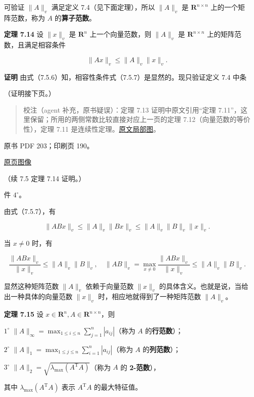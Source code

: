 \documentclass[
  10pt,
  fontset=fandol]{ctexart}
\begin{document}
可验证 \(\|A\|_v\) 满足定义 7.4（见下面定理），所以 \(\|A\|_v\) 是
\(\mathbf R^{n\times n}\) 上的一个矩阵范数，称为 \(A\)
的\textbf{算子范数}。

\textbf{定理 7.14} 设 \(\|x\|_v\) 是 \(\mathbf R^n\) 上一个向量范数，则
\(\|A\|_v\) 是 \(\mathbf R^{n\times n}\) 上的矩阵范数，且满足相容条件

\[
\|Ax\|_v\leqslant\|A\|_v\|x\|_v.
\tag{7.5.7}
\]

\textbf{证明}
由式（7.5.6）知，相容性条件式（7.5.7）是显然的。现只验证定义 7.4 中条

（证明接下页。）

\begin{quote}
校注（agent 补充，原书疑误）：定理 7.13 证明中原文引用``定理
7.11''，这里保留；所用的两侧常数比较直接对应上一页的定理
7.12（向量范数的等价性），定理 7.11
是连续性定理。\href{../../../staging/ch07b/assets/202-reference.png}{原文局部图}。
\end{quote}

\clearpage

原书 PDF 203；印刷页 190。

\href{../../../source-images/pdf-203.jpeg}{原页图像}

（续 7.5 定理 7.14 证明。）

件 \(4^\circ\)。

由式（7.5.7），有

\[
\|ABx\|_v\leqslant\|A\|_v\|Bx\|_v\leqslant\|A\|_v\|B\|_v\|x\|_v.
\]

当 \(x\neq0\) 时，有

\[
\frac{\|ABx\|_v}{\|x\|_v}\leqslant\|A\|_v\|B\|_v,\quad
\|AB\|_v=\max_{x\neq0}\frac{\|ABx\|_v}{\|x\|_v}\leqslant\|A\|_v\|B\|_v.
\]

显然这种矩阵范数 \(\|A\|_v\) 依赖于向量范数 \(\|x\|_v\)
的具体含义。也就是说，当给出一种具体的向量范数 \(\|x\|_v\)
时，相应地就得到了一种矩阵范数 \(\|A\|_v\)。

\textbf{定理 7.15} 设 \(x\in\mathbf R^n,A\in\mathbf R^{n\times n}\)，则

\(1^\circ\)
\(\|A\|_\infty=\max_{1\leqslant i\leqslant n}\sum_{j=1}^{n}|a_{ij}|\)（称为
\(A\) 的\textbf{行范数}）；

\(2^\circ\)
\(\|A\|_1=\max_{1\leqslant j\leqslant n}\sum_{i=1}^{n}|a_{ij}|\)（称为
\(A\) 的\textbf{列范数}）；

\(3^\circ\) \(\|A\|_2=\sqrt{\lambda_{\max}(A^{\mathrm T}A)}\)（称为
\(A\) 的 \textbf{2-范数}），

其中 \(\lambda_{\max}(A^{\mathrm T}A)\) 表示 \(A^{\mathrm T}A\)
的最大特征值。
\end{document}
